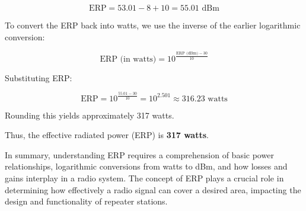 \[
\text{ERP} = 53.01 - 8 + 10 = 55.01 \text{ dBm}
\]

To convert the ERP back into watts, we use the inverse of the earlier logarithmic conversion:

\[
\text{ERP (in watts)} = 10^{\frac{\text{ERP (dBm)} - 30}{10}} 
\]

Substituting ERP:

\[
\text{ERP} = 10^{\frac{55.01 - 30}{10}} = 10^{2.501} \approx 316.23 \text{ watts}
\]

Rounding this yields approximately 317 watts.

Thus, the effective radiated power (ERP) is \textbf{317 watts}. 

In summary, understanding ERP requires a comprehension of basic power relationships, logarithmic conversions from watts to dBm, and how losses and gains interplay in a radio system. The concept of ERP plays a crucial role in determining how effectively a radio signal can cover a desired area, impacting the design and functionality of repeater stations.
